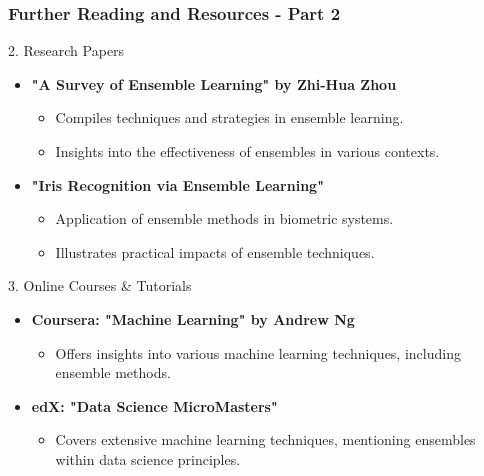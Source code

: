 \documentclass[aspectratio=169]{beamer}
\begin{document}
\begin{frame}[fragile]
  \frametitle{Further Reading and Resources - Part 2}
  \begin{block}{2. Research Papers}
    \begin{itemize}
      \item \textbf{"A Survey of Ensemble Learning" by Zhi-Hua Zhou}
        \begin{itemize}
          \item Compiles techniques and strategies in ensemble learning.
          \item Insights into the effectiveness of ensembles in various contexts.
        \end{itemize}
      \item \textbf{"Iris Recognition via Ensemble Learning"}
        \begin{itemize}
          \item Application of ensemble methods in biometric systems.
          \item Illustrates practical impacts of ensemble techniques.
        \end{itemize}
    \end{itemize}
  \end{block}

  \begin{block}{3. Online Courses \& Tutorials}
    \begin{itemize}
      \item \textbf{Coursera: "Machine Learning" by Andrew Ng}
        \begin{itemize}
          \item Offers insights into various machine learning techniques, including ensemble methods.
        \end{itemize}
      \item \textbf{edX: "Data Science MicroMasters"}
        \begin{itemize}
          \item Covers extensive machine learning techniques, mentioning ensembles within data science principles.
        \end{itemize}
    \end{itemize}
  \end{block}
\end{frame}
\end{document}
